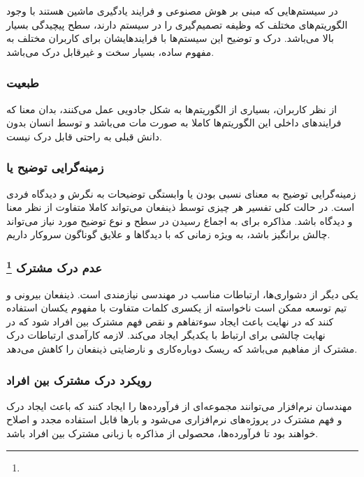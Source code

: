 در سیستم‌هایی که مبنی بر هوش مصنوعی و فرایند یادگیری ماشین هستند با وجود
الگوریتم‌های مختلف که وظیفه تصمیم‌گیری را در سیستم دارند، سطح پیچیدگی بسیار بالا
می‌باشد. درک و توضیح این سیستم‌ها با فرایند‌هایشان برای کاربران مختلف به مفهوم
ساده، بسیار سخت و غیرقابل درک می‌باشد.

\subsubsection{طبعیت }

از نظر کاربران، بسیاری از الگوریتم‌ها به شکل جادویی عمل می‌کنند، بدان معنا که
فرایند‌های داخلی این الگوریتم‌ها کاملا به صورت مات می‌باشد و توسط انسان بدون
دانش قبلی به راحتی قابل درک نیست.

\subsubsection{زمینه‌گرایی توضیح یا }

زمینه‌گرایی توضیح به معنای نسبی بودن یا وابستگی توضیحات به نگرش و دیدگاه فردی
است. در حالت کلی تفسیر هر چیزی توسط ذینفعان می‌تواند کاملا متفاوت از نظر معنا و
دیدگاه باشد. مذاکره برای به اجماع رسیدن در سطح و نوع توضیح مورد نیاز می‌تواند
چالش برانگیز باشد، به ویژه زمانی که با دیدگاها و علایق گوناگون سروکار داریم.

\subsubsection*{عدم درک مشترک \footnote{}}

یکی دیگر از دشواری‌ها، ارتباطات مناسب در مهندسی نیازمندی است. ذینفعان بیرونی و
تیم توسعه ممکن است ناخواسته از یکسری کلمات متفاوت با مفهوم یکسان استفاده کنند که
در نهایت باعث ایجاد سوء‌تفاهم و نقص فهم مشترک بین افراد شود که در نهایت چالشی
برای ارتباط با یکدیگر ایجاد می‌کند. لازمه کارآمدی ارتباطات درک مشترک از مفاهیم
می‌باشد که ریسک دوباره‌کاری و نارضایتی ذینفعان را کاهش می‌دهد.

\subsubsection*{رویکرد درک مشترک بین افراد}

مهندسان نرم‌افزار می‌توانند مجموعه‌ای از فرآورده‌ها را ایجاد کنند که باعث ایجاد
درک و فهم مشترک در پروژه‌های نرم‌افزاری می‌شود و بار‌ها قابل استفاده مجدد و
اصلاح خواهند بود تا فرآورده‌ها، محصولی از مذاکره با زبانی مشترک بین افراد باشد.

